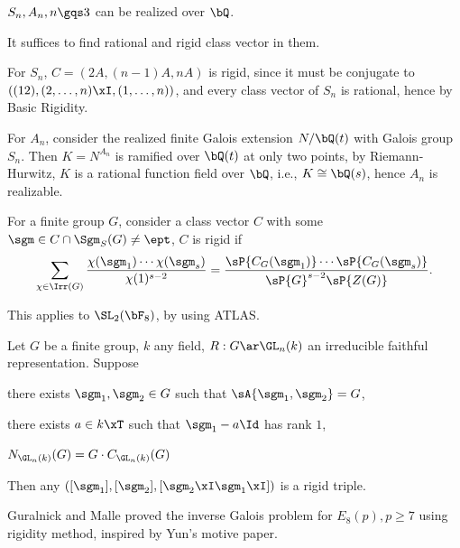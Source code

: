 \documentclass[0-main]{subfiles}
\begin{document}
\begin{thm}[Proposition~5.2]
	$S_{n},A_{n},n\gqs3$ can be realized over $\bQ$.
\end{thm}
\begin{prf}
	It suffices to find rational and rigid class vector in them.

	For $S_{n}$, $C=(2A, (n-1)A, nA)$ is rigid, since it must be conjugate to $((12),(2,\ldots,n)\xI,(1,\ldots,n))$, and every class vector of $S_{n}$ is rational, hence by Basic Rigidity.

	For $A_{n}$, consider the realized finite Galois extension $N/\bQ(t)$ with Galois group $S_{n}$. Then $K=N^{A_{n}}$ is ramified over $\bQ(t)$ at only two points, by Riemann-Hurwitz, $K$ is a rational function field over $\bQ$, i.e., $K\cong\bQ(s)$, hence $A_{n}$ is realizable.
\end{prf}



\begin{thm}[Corollary~5.9]
	For a finite group $G$, consider a class vector $C$ with some $\sgm\in C\cap\Sgm_{S}(G)\neq\ept$, $C$ is rigid if
	\[
		\sum_{\chi\in\Irr(G)}\frac{\chi(\sgm_{1})\cdots\chi(\sgm_{s})}{\chi(1)^{s-2}}=\frac{\sP{C_{G}(\sgm_{1})}\cdots\sP{C_{G}(\sgm_{s})}}{\sP{G}^{s-2}\sP{Z(G)}}.
	\]
\end{thm}

\begin{rmk}
	This applies to $\SL_{2}(\bF_{8})$, by using ATLAS\cite{CCNPW1985}.
\end{rmk}


\begin{thm}
	Let $G$ be a finite group, $k$ any field, $R:G\ar\GL_{n}(k)$ an irreducible faithful representation. Suppose
	\begin{enr}
		\item there exists $\sgm_{1},\sgm_{2}\in G$ such that $\sA{\sgm_{1},\sgm_{2}}=G$,
		\item there exists $a\in k\xT$ such that $\sgm_{1}-a\Id$ has rank $1$,
		\item $N_{\GL_{n}(k)}(G)=G\cdot C_{\GL_{n}(k)}(G)$
	\end{enr}
	Then any $([\sgm_{1}],[\sgm_{2}],[\sgm_{2}\xI\sgm_{1}\xI])$ is a rigid triple.
\end{thm}

Guralnick and Malle proved the inverse Galois problem for $E_{8}(p), p\geq7$ using rigidity method\cite{GM2014}, inspired by Yun's motive paper\cite{Yun2014Motives}.
\end{document}
